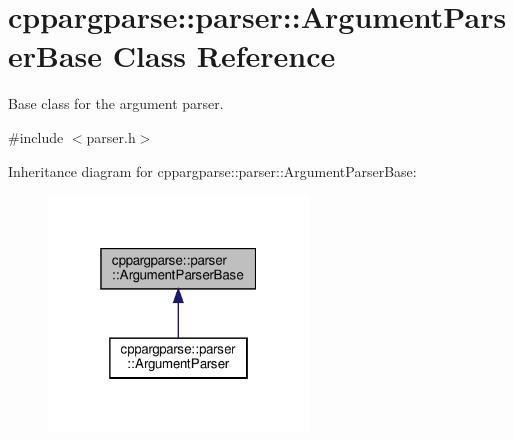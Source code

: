\hypertarget{classcppargparse_1_1parser_1_1ArgumentParserBase}{}\section{cppargparse\+:\+:parser\+:\+:Argument\+Parser\+Base Class Reference}
\label{classcppargparse_1_1parser_1_1ArgumentParserBase}


Base class for the argument parser.  




{\ttfamily \#include $<$parser.\+h$>$}



Inheritance diagram for cppargparse\+:\+:parser\+:\+:Argument\+Parser\+Base\+:\nopagebreak
\begin{figure}[H]
\begin{center}
\leavevmode
\includegraphics[width=196pt]{classcppargparse_1_1parser_1_1ArgumentParserBase__inherit__graph}
\end{center}
\end{figure}
